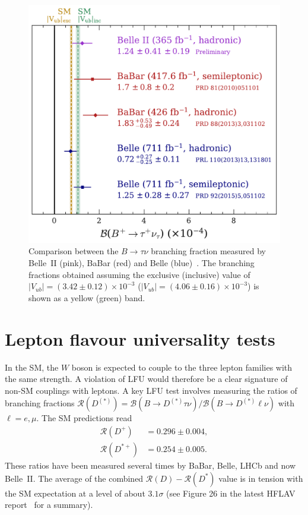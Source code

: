 \documentclass{moriond}
\def\bea{\begin{eqnarray}}
\def\eea{\end{eqnarray}}
\def\vub{V_{ub}}
\def\rd{\mathcal{R}\left(D\right)}
\def\rdp{\mathcal{R}\left(D^+\right)}
\def\rdst{\mathcal{R}\left(D^*\right)}
\def\rdstp{\mathcal{R}\left(D^{*+}\right)}
\def\rddst{\mathcal{R}\left(D^{(*)}\right)}
\begin{document}
\begin{figure}[h!]
    \centering
    \includegraphics[scale=0.4]{Figures/Final_Unblinding_.pdf}
    \caption{Comparison between the $B \to \tau\nu$ branching fraction measured by Belle~II (pink), BaBar (red) and Belle (blue)~\cite{gio}. The branching fractions obtained assuming the exclusive (inclusive) value of $|\vub| = (3.42 \pm 0.12)\times 10^{-3}$ ($|\vub| = (4.06 \pm 0.16)\times 10^{-3}$) is shown as a yellow (green) band.}
    \label{fig:Final_Unblinding_}
\end{figure}

\section{Lepton flavour universality tests}
In the SM, the $W$ boson is expected to couple to the three lepton families with the same strength. A violation of LFU would therefore be a clear signature of non-SM couplings with leptons. A key LFU test involves measuring the ratios of branching fractions $\rddst = \mathcal{B}(B \to D^{(*)}\tau\nu)/\mathcal{B}(B \to D^{(*)}\ell\nu)$ with $\ell=e,\mu$. The SM predictions read
\bea
    \rdp &= 0.296 \pm 0.004, \\
    \rdstp &= 0.254 \pm 0.005.
\eea
These ratios have been measured several times by BaBar, Belle, LHCb and now Belle~II. The average of the combined $\rd-\rdst$ value is in tension with the SM expectation at a level of about $3.1\sigma$ (see Figure 26 in the latest HFLAV report~\cite{hflav} for a summary).
\end{document}
